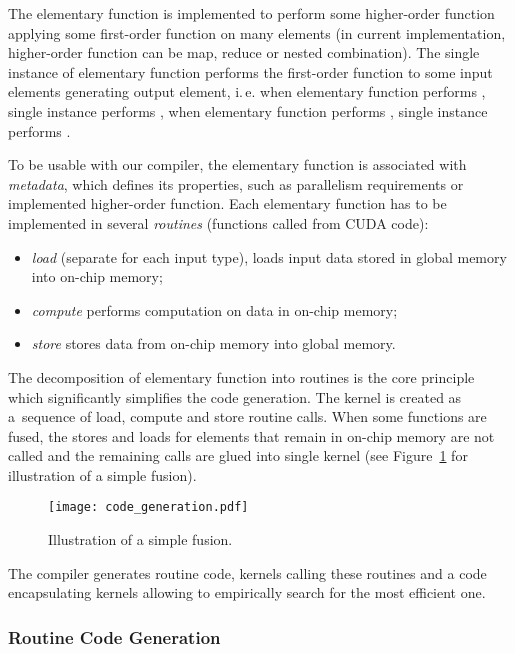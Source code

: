 \documentclass[final]{siamltex}
\def\ie{i.\,e.}
\begin{document}
{The elementary function is implemented to perform some higher-order function applying some first-order function on many elements (in current implementation, higher-order function can be map, reduce or nested combination). The single instance of elementary function performs the first-order function to some input elements generating output element, \ie{} when elementary function performs , single instance performs , when elementary function performs , single instance performs .

To be usable with our compiler, the elementary function is associated with \textit{metadata}, which defines its properties, such as parallelism requirements or implemented higher-order function. Each elementary function has to be implemented in several \textit{routines} (functions called from CUDA code):
\begin{itemize}
        \item \textit{load} (separate for each input type), loads input data stored in global memory into on-chip memory;
        \item \textit{compute} performs computation on data in on-chip memory;
        \item \textit{store} stores data from on-chip memory into global memory.
\end{itemize}

The decomposition of elementary function into routines is the core principle which significantly simplifies the code generation. The kernel is created as a~sequence of load, compute and store routine calls. When some functions are fused, the stores and loads for elements that remain in on-chip memory are not called and the remaining calls are glued into single kernel (see Figure~\ref{fig:code_fusion} for illustration of a simple fusion).

\begin {figure}[h]
  \begin{center}
    \texttt{[image: code\_generation.pdf]}
  \end{center}
  \caption{Illustration of a simple fusion.}
  \label{fig:code_fusion}
\end {figure}

The compiler generates routine code, kernels calling these routines and a code encapsulating kernels allowing to empirically search for the most efficient one.

\subsubsection{Routine Code Generation}

}
\end{document}
